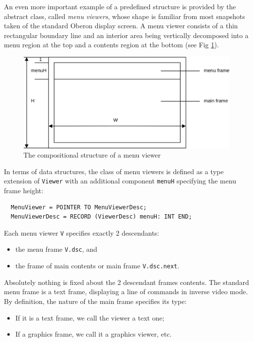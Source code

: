 An even more important example of a predefined structure
is provided by the abstract class, called \emph{menu viewers},
whose shape is familiar from most snapshots taken of the standard Oberon display screen.
A menu viewer consists of a thin rectangular boundary line and an interior area
being vertically decomposed into a menu region at the top
and a contents region at the bottom (see Fig \ref{fig:menu}).
\begin{figure}[h!]
  \centering
  \includegraphics[width=\textwidth]{i/7}
  \caption{The compositional structure of a menu viewer}
  \label{fig:menu}
\end{figure}

In terms of data structures, the class of menu viewers is defined as a type extension of
\verb|Viewer| with an additional component \verb|menuH| specifying the menu frame height:
\begin{verbatim}
  MenuViewer = POINTER TO MenuViewerDesc;
  MenuViewerDesc = RECORD (ViewerDesc) menuH: INT END;
\end{verbatim}
Each menu viewer \verb|V| specifies exactly 2 descendants:
\begin{itemize}
  \item the menu frame \verb|V.dsc|, and
  \item the frame of main contents or main frame \verb|V.dsc.next|.
\end{itemize}
Absolutely nothing is fixed about the 2 descendant frames contents.
The standard menu frame is a text frame, displaying a line of commands in inverse video mode.
By definition, the nature of the main frame specifies its type:
\begin{itemize}
  \item If it is a text frame, we call the viewer a text one;
  \item If a graphics frame, we call it a graphics viewer, etc.
\end{itemize}
